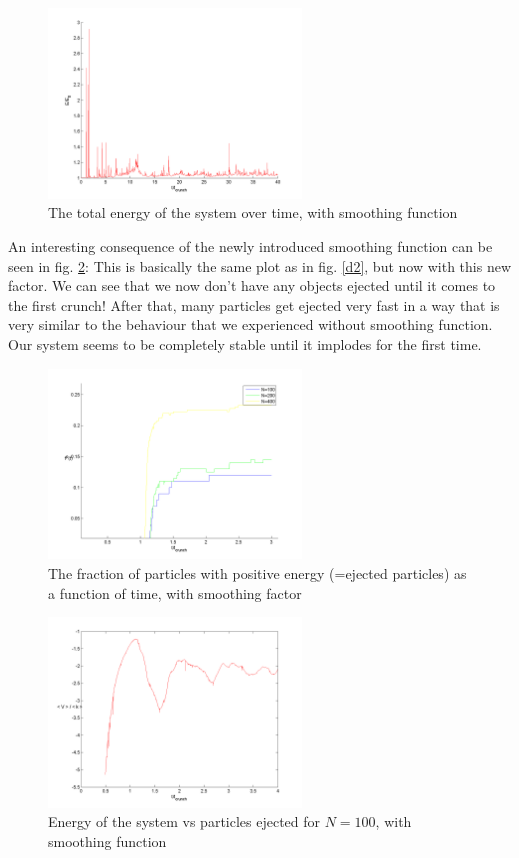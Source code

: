 \documentclass[10pt,a4paper]{article}
\begin{document}
\begin{figure}[h]
\centering
	\includegraphics[width=0.6\textwidth]{e1.png}
	\caption{The total energy of the system over time, with smoothing function\label{e1}}
\end{figure}

An interesting consequence of the newly introduced smoothing function can be seen in fig. \ref{e2}: This is basically the same plot as in fig. \ref{d2}, but now with this new factor. We can see that we now don't have any objects ejected until it comes to the first crunch! After that, many particles get ejected very fast in a way that is very similar to the behaviour that we experienced without smoothing function. Our system seems to be completely stable until it implodes for the first time.

\begin{figure}[h]
\centering
	\includegraphics[width=0.6\textwidth]{e2.png}
	\caption{The fraction of particles with positive energy (=ejected particles) as a function of time, with smoothing factor\label{e2}}
\end{figure}
\begin{figure}[h]
\centering
	\includegraphics[width=0.6\textwidth]{f1.png}
	\caption{Energy of the system vs particles ejected for $N=100$, with smoothing function\label{f1}}
\end{figure}
\end{document}
